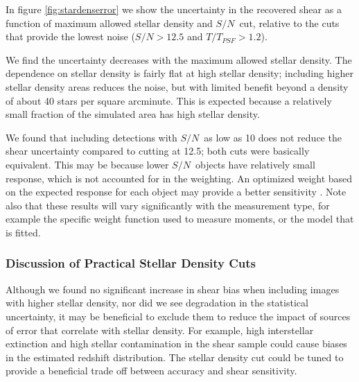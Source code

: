 \documentclass[twocolumn,twocolappendix,astrosym]{openjournal}
\newcommand{\snr}{$S/N$}
\begin{document}
In figure \ref{fig:stardenserror} we show the uncertainty in the recovered
shear as a function of maximum allowed stellar density and \snr\ cut, relative
to the cuts that provide the lowest noise ($S/N > 12.5$ and $T/T_{PSF} > 1.2$).

We find the uncertainty decreases with the maximum allowed stellar density. The
dependence on stellar density is fairly flat at high stellar density; including
higher stellar density areas reduces the noise, but with limited benefit beyond
a density of about 40 stars per square arcminute.  This is expected because a
relatively small fraction of the simulated area has high stellar density.



We found that including detections with \snr\ as low as 10 does not reduce the
shear uncertainty compared to cutting at 12.5; both cuts were basically
equivalent.  This may be because lower \snr\ objects have relatively small
response, which is not accounted for in the weighting.  An optimized weight
based on the expected response for each object may provide a better sensitivity
\citep{GattiY3Shear2021}.  Note also that these results will vary significantly
with the measurement type, for example the specific weight function used to
measure moments, or the model that is fitted.

\subsubsection{Discussion of Practical Stellar Density Cuts}

Although we found no significant increase in shear bias when including images
with higher stellar density, nor did we see degradation in the statistical
uncertainty, it may be beneficial to exclude them to reduce the impact of
sources of error that correlate with stellar density.  For example, high
interstellar extinction and high stellar contamination in the shear sample
could cause biases in the estimated redshift distribution.  The stellar density
cut could be tuned to provide a beneficial trade off between accuracy and shear
sensitivity.
\end{document}
